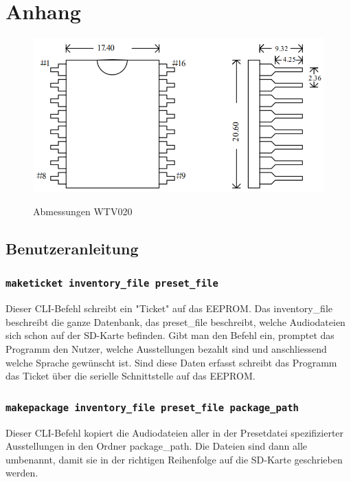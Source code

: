 \chapter{Anhang}
\label{Anhang}
\thispagestyle{fancy}  
\begin{figure}[h]
\centering
\includegraphics[scale=0.5]{Bilder/footprint_wtv020.png}
\label{fig:irgendesBild}
\caption[Abmessungen WTV020]{Abmessungen WTV020}
\end{figure}

\section{Benutzeranleitung}
\subsection{\texttt{maketicket inventory\_file preset\_file}}
Dieser CLI-Befehl schreibt ein "Ticket" auf das EEPROM.
Das inventory\_file beschreibt die ganze Datenbank, 
das preset\_file beschreibt, welche Audiodateien sich schon auf der SD-Karte befinden.
Gibt man den Befehl ein, promptet das Programm den Nutzer, 
welche Ausstellungen bezahlt sind und anschliessend welche Sprache gewünscht ist.
Sind diese Daten erfasst schreibt das Programm das Ticket über die serielle Schnittstelle auf das EEPROM.
\subsection{\texttt{makepackage inventory\_file preset\_file package\_path}}
Dieser CLI-Befehl kopiert die Audiodateien aller in der Presetdatei spezifizierter Ausstellungen in den Ordner package\_path. 
Die Dateien sind dann alle umbenannt, damit sie in der richtigen Reihenfolge auf die SD-Karte geschrieben werden.
